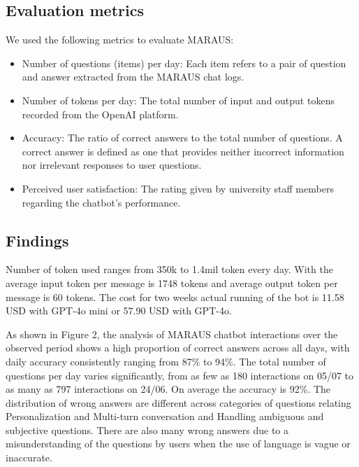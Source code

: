 \documentclass[runningheads]{llncs}
\begin{document}
\subsection{Evaluation metrics}
We used the following metrics to evaluate MARAUS:
\begin{itemize}
    \item Number of questions (items) per day: Each item refers to a pair of question and answer extracted from the MARAUS chat logs.
    \item Number of tokens per day: The total number of input and output tokens recorded from the OpenAI platform.
    \item Accuracy: The ratio of correct answers to the total number of questions. A correct answer is defined as one that provides neither incorrect information nor irrelevant responses to user questions.
    \item Perceived user satisfaction: The rating given by university staff members regarding the chatbot's performance.
\end{itemize}


\subsection{Findings}

Number of token used ranges from 350k to 1.4mil token every day. With the average input token per message is 1748 tokens and average output token per message is 60 tokens.
The cost for two weeks actual running of the bot is 11.58 USD with GPT-4o mini or 57.90 USD with GPT-4o.


As shown in Figure 2, the analysis of MARAUS chatbot interactions over the observed period shows a high proportion of correct answers across all days, with daily accuracy consistently ranging from 87\% to 94\%. The total number of questions per day varies significantly, from as few as 180 interactions on 05/07 to as many as 797 interactions on 24/06. On average the accuracy is 92\%. The distribution of wrong answers are different across categories of questions relating Personalization and Multi-turn conversation and Handling ambiguous and subjective questions. There are also many wrong answers due to a misunderstanding of the questions by users when the use of language is vague or inaccurate.
\end{document}
